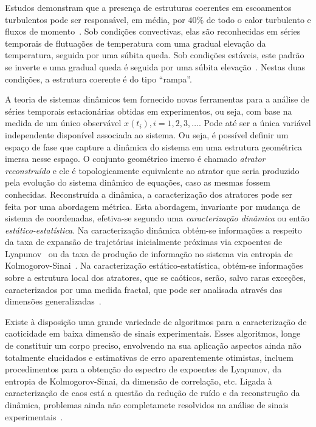 
Estudos demonstram que a presença de estruturas coerentes em escoamentos turbulentos pode ser responsável, em média, por $40\%$ de todo o calor turbulento e fluxos de momento~\cite{lu/94}. Sob condições convectivas, elas são reconhecidas em séries temporais de flutuações de temperatura com uma gradual elevação da temperatura, seguida por uma súbita queda. Sob condições estáveis, este padrão se inverte e uma gradual queda é seguida por uma súbita elevação~\cite{oliver/02}. Nestas duas condições, a estrutura coerente é do tipo ``rampa''. 

A teoria de sistemas dinâmicos tem fornecido novas ferramentas para a análise de séries temporais estacionárias obtidas em experimentos, ou seja, com base na medida de um único observável $x(t_{i}),i=1,2,3,\ldots$. Pode até ser a única variável independente disponível associada ao sistema. Ou seja, é possível definir um espaço de fase que capture a dinâmica do sistema em uma estrutura geométrica imersa nesse espaço. O conjunto geométrico imerso é chamado \textit{atrator reconstruído} e ele é topologicamente equivalente ao atrator que seria produzido pela evolução do sistema dinâmico de equações, caso as mesmas fossem conhecidas. Reconstruída a dinâmica, a caracterização dos atratores pode ser feita por uma abordagem métrica. Esta abordagem, invariante por mudança de sistema de coordenadas, efetiva-se segundo uma \textit{caracterização dinâmica} ou então \textit{estático-estatística}. Na caracterização dinâmica obtém-se informações a respeito da taxa de expansão de trajetórias inicialmente próximas via expoentes de Lyapunov~\cite{eckrue/86,sanosawada/85} ou da taxa de produção de informação no sistema via entropia de Kolmogorov-Sinai~\cite{ruelleentrop/89}. Na caracterização estático-estatística, obtém-se informações sobre a estrutura local dos atratores, que se caóticos, serão, salvo raras exceções, caracterizados por uma medida fractal, que pode ser analisada através das dimensões generalizadas~\cite{grassproca/83}.

Existe à disposição uma grande variedade de algoritmos para a caracterização de caoticidade em baixa dimensão de sinais experimentais. Esses algoritmos, longe de constituir um corpo preciso, envolvendo na sua aplicação aspectos ainda não totalmente elucidados e estimativas de erro aparentemente otimistas, incluem procedimentos para a obtenção do espectro de expoentes de Lyapunov, da entropia de Kolmogorov-Sinai, da dimensão de correlação, etc. Ligada à caracterização de caos está a questão da redução de ruído e da reconstrução da dinâmica, problemas ainda não completamete resolvidos na análise de sinais experimentais~\cite{aguirre/00}. 

